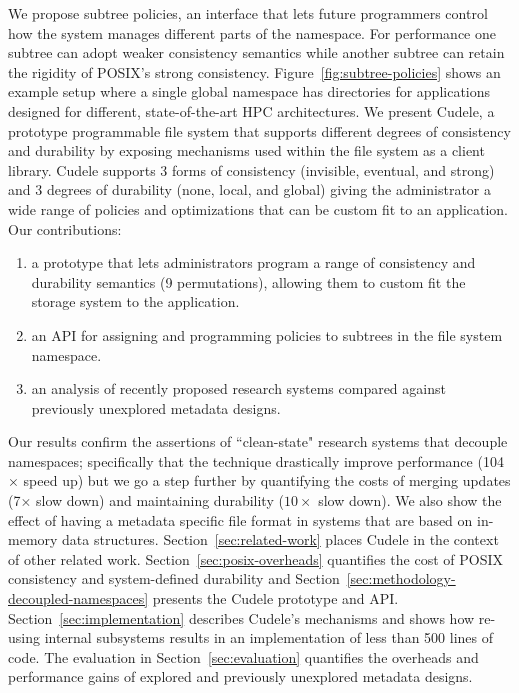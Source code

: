 We propose subtree policies, an interface that lets future programmers control
how the system manages different parts of the namespace.  For performance one
subtree can adopt weaker consistency semantics while another subtree can retain
the rigidity of POSIX's strong consistency. Figure~\ref{fig:subtree-policies}
shows an example setup where a single global namespace has directories for
applications designed for different, state-of-the-art HPC architectures.  We
present Cudele, a prototype programmable file system that supports different
degrees of consistency and durability by exposing mechanisms used within the
file system as a client library.  Cudele supports 3 forms of consistency
(invisible, eventual, and strong) and 3 degrees of durability (none, local, and
global) giving the administrator a wide range of policies and optimizations
that can be custom fit to an application. Our contributions: 

\begin{enumerate}

  \item a prototype that lets administrators program a range of
  consistency and durability semantics (9 permutations), allowing them to custom
  fit the storage system to the application.

  \item an API for assigning and programming policies to subtrees in the file
  system namespace.

  \item an analysis of recently proposed research systems compared against
  previously unexplored metadata designs.

\end{enumerate}

Our results confirm the assertions of ``clean-state" research systems that
decouple namespaces; specifically that the technique drastically improve
performance (104\(\times\) speed up) but we go a step further by quantifying
the costs of merging updates (7\(\times\) slow down) and maintaining durability
(\(10\times\) slow down). We also show the effect of having a metadata specific
file format in systems that are based on in-memory data structures.
Section~\ref{sec:related-work} places Cudele in the context of other related
work. Section~\ref{sec:posix-overheads} quantifies the cost of POSIX
consistency and system-defined durability and
Section~\ref{sec:methodology-decoupled-namespaces} presents the Cudele
prototype and API. Section~\ref{sec:implementation} describes Cudele's
mechanisms and shows how re-using internal subsystems results in an
implementation of less than 500 lines of code. The evaluation in
Section~\ref{sec:evaluation} quantifies the overheads and performance gains of
explored and previously unexplored metadata designs.

